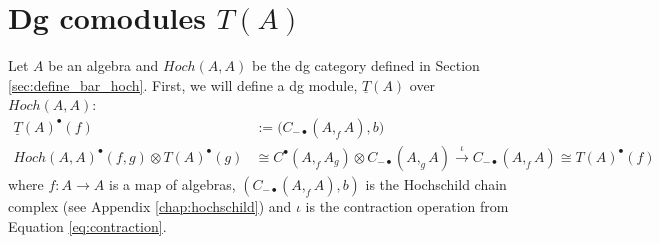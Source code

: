 \section{Dg comodules $T(A)$} \label{sec:dg_comod}
Let $A$ be an algebra and 
$Hoch(A,A)$ be the dg category 
defined in Section 
\ref{sec:define_bar_hoch}. First, 
we will define a dg module, 
$\underline{T}(A)$ over $Hoch(A,A)$:
%
\begin{align*}
\underline{T}(A)^\bullet(f)
&:= 
\big( C_{-\bullet}(A,_fA), b \big) \\
Hoch(A,A)^\bullet(f,g) \otimes T(A)^\bullet(g)
&\cong 
C^\bullet(A, _fA_g) \otimes C_{-\bullet}(A, _gA)
\xrightarrow{\iota}
C_{-\bullet}(A, _fA) \cong T(A)^\bullet(f)
\end{align*}
where $f:A\to A$ is a map of algebras, 
$( C_{-\bullet}(A,_fA), b )$ is the 
Hochschild chain complex (see Appendix 
\ref{chap:hochschild}) and $\iota$ is the 
contraction operation from Equation 
\ref{eq:contraction}.

